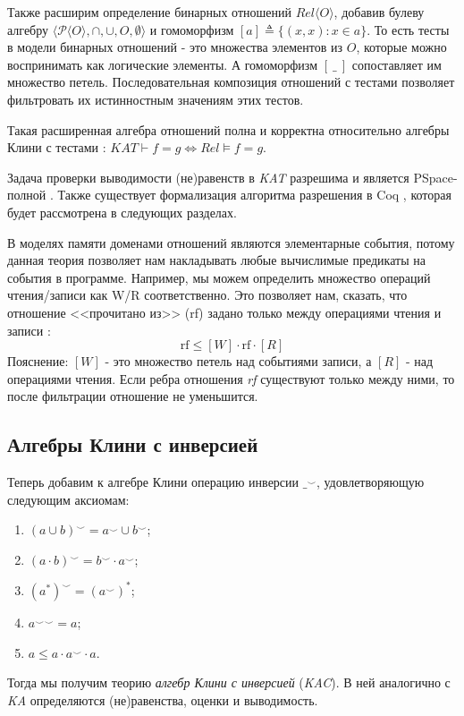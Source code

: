 \documentclass[times
              ,specification
              ,annotation
              ]{itmo-student-thesis}
\begin{document}
      Также расширим определение бинарных отношений $Rel \langle O \rangle $, добавив булеву алгебру $\langle
      \mathcal{P}\langle O \rangle, \cap, \cup, O, \emptyset \rangle$ и гомоморфизм $ [a] \triangleq \{(x, x): x \in a\} $.
      То есть тесты в модели бинарных отношений - это множества элементов из $O$, которые можно
      воспринимать как логические элементы. А гомоморфизм $[\:\_\:]$ сопоставляет им множество петель.
      Последовательная композиция отношений с тестами позволяет фильтровать их истинностным значениям
      этих тестов.

      Такая расширенная алгебра отношений полна и корректна относительно алгебры Клини с тестами
      \cite{kat_completeness}: $\mathit{KAT} \vdash f = g \Leftrightarrow \mathit{Rel} \models f = g$.
      
      Задача проверки выводимости (не)равенств в \textit{KAT} разрешима и является PSpace-полной
      \cite{kat_complexity}. Также существует формализация алгоритма разрешения в Coq \cite{kat},
      которая будет рассмотрена в следующих разделах.

      В моделях памяти доменами отношений являются элементарные события, потому данная теория позволяет
      нам накладывать любые вычислимые предикаты на события в программе. Например, мы можем определить
      множество операций чтения/записи как W/R соответственно.
      Это позволяет нам, сказать, что отношение <<прочитано из>> (rf) задано только между
      операциями чтения и записи \cite{rc11}:
      $$ \text{rf} \leq [W] \cdot \text{rf} \cdot [R] $$
      Пояснение: $ [W] $ - это множество петель над событиями записи, а $[R]$ - над операциями чтения.
      Если ребра отношения \textit{rf} существуют только между ними, то после фильтрации отношение не
      уменьшится. 


    \subsection{Алгебры Клини с инверсией}
      Теперь добавим к алгебре Клини операцию инверсии $ \_^{\smile} $, удовлетворяющую следующим аксиомам:
      \begin{enumerate}
        \item $ (a \cup b)^{\smile} = a^{\smile} \cup b^{\smile} $;
        \item $ (a \cdot b)^{\smile} = b^{\smile} \cdot a^{\smile} $;
        \item $ (a^*)^{\smile} = (a^{\smile})^* $;
        \item $ {a^{\smile}}^{\smile} = a $;
        \item $ a \leq a \cdot a^{\smile} \cdot a $.
      \end{enumerate}
      Тогда мы получим теорию \textit{алгебр Клини с инверсией} (\textit{KAC}).
      В ней аналогично с \textit{KA} определяются (не)равенства, оценки и выводимость.
\end{document}
